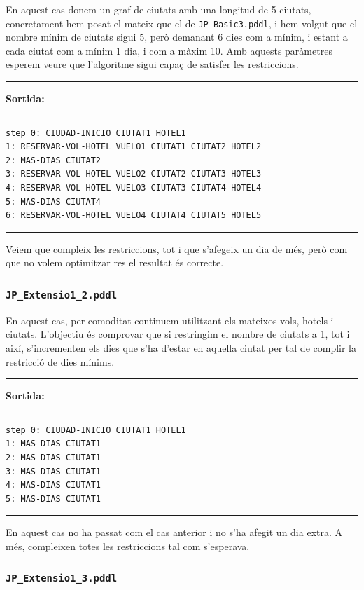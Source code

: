 \documentclass[11pt,a4paper]{article}
\begin{document}
En aquest cas donem un graf de ciutats amb una longitud de 5 ciutats, concretament hem posat el mateix que el de \texttt{JP\_Basic3.pddl}, i hem volgut que el nombre mínim de ciutats sigui 5, però demanant 6 dies com a mínim, i estant a cada ciutat com a mínim 1 dia, i com a màxim 10. Amb aquests paràmetres esperem veure que l'algoritme sigui capaç de satisfer les restriccions. 

\begin{samepage}
\medskip
\noindent
\rule{0.1\textwidth}{0.5mm}
\textbf{Sortida:}
\rule{0.76\textwidth}{0.5mm}
\begin{verbatim}
step 0: CIUDAD-INICIO CIUTAT1 HOTEL1
1: RESERVAR-VOL-HOTEL VUELO1 CIUTAT1 CIUTAT2 HOTEL2
2: MAS-DIAS CIUTAT2
3: RESERVAR-VOL-HOTEL VUELO2 CIUTAT2 CIUTAT3 HOTEL3
4: RESERVAR-VOL-HOTEL VUELO3 CIUTAT3 CIUTAT4 HOTEL4
5: MAS-DIAS CIUTAT4
6: RESERVAR-VOL-HOTEL VUELO4 CIUTAT4 CIUTAT5 HOTEL5
\end{verbatim}
\rule{\textwidth}{0.5mm}
\medskip
\end{samepage}

Veiem que compleix les restriccions, tot i que s'afegeix un dia de més, però com que no volem optimitzar res el resultat és correcte.

\subsubsection*{\texttt{JP\_Extensio1\_2.pddl}}

En aquest cas, per comoditat continuem utilitzant els mateixos vols, hotels i ciutats. L'objectiu és comprovar que si restringim el nombre de ciutats a 1, tot i així, s'incrementen els dies que s'ha d'estar en aquella ciutat per tal de complir la restricció de dies mínims.

\begin{samepage}
\medskip
\noindent
\rule{0.1\textwidth}{0.5mm}
\textbf{Sortida:}
\rule{0.76\textwidth}{0.5mm}
\begin{verbatim}
step 0: CIUDAD-INICIO CIUTAT1 HOTEL1
1: MAS-DIAS CIUTAT1
2: MAS-DIAS CIUTAT1
3: MAS-DIAS CIUTAT1
4: MAS-DIAS CIUTAT1
5: MAS-DIAS CIUTAT1
\end{verbatim}
\rule{\textwidth}{0.5mm}
\medskip
\end{samepage}

En aquest cas no ha passat com el cas anterior i no s'ha afegit un dia extra. A més, compleixen totes les restriccions tal com s'esperava.

\subsubsection*{\texttt{JP\_Extensio1\_3.pddl}}
\end{document}
